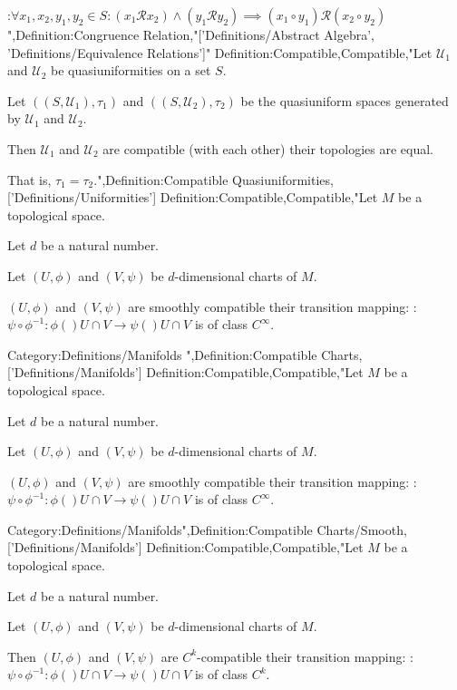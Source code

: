 :$\forall x_1, x_2, y_1, y_2 \in S: \left( x_1 \mathrel \mathcal R x_2 \right) \land \left( y_1 \mathrel \mathcal R y_2 \right) \implies \left( x_1 \circ y_1 \right) \mathrel \mathcal R \left( x_2 \circ y_2 \right)$",Definition:Congruence Relation,"['Definitions/Abstract Algebra', 'Definitions/Equivalence Relations']"
Definition:Compatible,Compatible,"Let $\mathcal U_1$ and $\mathcal U_2$ be quasiuniformities on a set $S$.

Let $\left( \left( S, \mathcal U_1 \right), \tau_1 \right)$ and $\left( \left( S, \mathcal U_2 \right), \tau_2 \right)$ be the quasiuniform spaces generated by $\mathcal U_1$ and $\mathcal U_2$.


Then $\mathcal U_1$ and $\mathcal U_2$ are compatible (with each other)  their topologies are equal.

That is,  $\tau_1 = \tau_2$.",Definition:Compatible Quasiuniformities,['Definitions/Uniformities']
Definition:Compatible,Compatible,"Let $M$ be a topological space.

Let $d$ be a natural number.

Let $\left( U, \phi \right)$ and $\left( V, \psi \right)$ be $d$-dimensional charts of $M$.


$\left( U, \phi \right)$ and $\left( V, \psi \right)$ are smoothly compatible  their transition mapping:
:$\psi \circ \phi^{-1} : \phi \left(   \right){U \cap V} \to \psi \left(   \right){U \cap V}$
is of class $C^\infty$.


Category:Definitions/Manifolds
",Definition:Compatible Charts,['Definitions/Manifolds']
Definition:Compatible,Compatible,"Let $M$ be a topological space.

Let $d$ be a natural number.

Let $\left( U, \phi \right)$ and $\left( V, \psi \right)$ be $d$-dimensional charts of $M$.


$\left( U, \phi \right)$ and $\left( V, \psi \right)$ are smoothly compatible  their transition mapping:
:$\psi \circ \phi^{-1} : \phi \left(   \right){U \cap V} \to \psi \left(   \right){U \cap V}$
is of class $C^\infty$.


Category:Definitions/Manifolds",Definition:Compatible Charts/Smooth,['Definitions/Manifolds']
Definition:Compatible,Compatible,"Let $M$ be a topological space.

Let $d$ be a natural number.

Let $\left( U, \phi \right)$ and $\left( V, \psi \right)$ be $d$-dimensional charts of $M$.


Then $\left( U, \phi \right)$ and $\left( V, \psi \right)$ are $C^k$-compatible  their transition mapping:
:$\psi \circ \phi^{-1}: \phi \left(   \right){U \cap V} \to \psi \left(   \right){U \cap V}$
is of class $C^k$.


